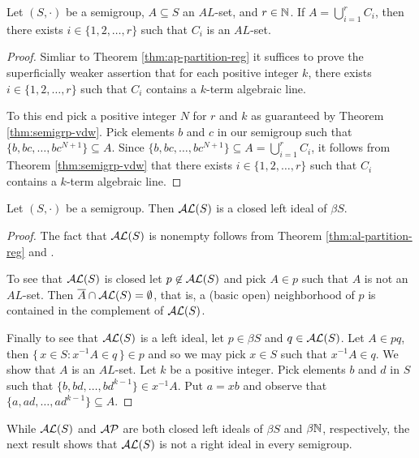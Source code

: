 \begin{thm}
  \label{thm:al-partition-reg}
  Let $(S, \cdot)$ be a semigroup, $A \subseteq S$ an $AL$-set, and $r \in \mathbb{N}$.
  If $A = \bigcup_{i=1}^r C_i$, then there exists $i \in \{1, 2, \ldots, r\}$ such that $C_i$ is an $AL$-set.
\end{thm}
\begin{proof}
  Simliar to Theorem \ref{thm:ap-partition-reg} it suffices to prove the superficially weaker assertion that for each positive integer $k$, there exists $i \in \{1, 2, \ldots, r\}$ such that $C_i$ contains a $k$-term algebraic line.
  
  To this end pick a positive integer $N$ for $r$ and $k$ as guaranteed by Theorem \ref{thm:semigrp-vdw}. 
  Pick elements $b$ and $c$ in our semigroup such that $\{b, bc, \ldots, bc^{N+1}\} \subseteq A$. 
  Since $\{b, bc, \ldots, bc^{N+1}\} \subseteq A = \bigcup_{i=1}^r C_i$, it follows from Theorem \ref{thm:semigrp-vdw} that there exists $i \in \{1, 2, \ldots, r\}$ such that $C_i$ contains a $k$-term algebraic line.
\end{proof}

\begin{thm}
  Let $(S, \cdot)$ be a semigroup.
  Then $\mathcal{AL}(S)$ is a closed left ideal of $\beta S$.
\end{thm}
\begin{proof}
  The fact that $\mathcal{AL}(S)$ is nonempty follows from Theorem \ref{thm:al-partition-reg} and \cite[Theorem 3.11]{Hindman:1998fk}. 

  To see that $\mathcal{AL}(S)$ is closed let $p \not\in \mathcal{AL}(S)$ and pick $A \in p$ such that $A$ is not an $AL$-set.
  Then $\overline{A} \cap \mathcal{AL}(S) = \emptyset$, that is, a (basic open) neighborhood of $p$ is contained in the complement of $\mathcal{AL}(S)$.

  Finally to see that $\mathcal{AL}(S)$ is a left ideal, let $p \in \beta S$ and $q \in \mathcal{AL}(S)$. 
  Let $A \in pq$, then $\{\, x \in S : x^{-1}A \in q \,\} \in p$ and so we may pick $x \in S$ such that $x^{-1}A \in q$. 
  We show that $A$ is an $AL$-set.
  Let $k$ be a positive integer.
  Pick elements $b$ and $d$ in $S$ such that $\{b, bd, \ldots, bd^{k-1}\} \in x^{-1}A$.
  Put $a = xb$ and observe that $\{a, ad, \ldots, ad^{k-1}\} \subseteq A$.
\end{proof}

While $\mathcal{AL}(S)$ and $\mathcal{AP}$ are both closed left ideals of $\beta S$ and $\beta \mathbb{N}$, respectively, the next result shows that $\mathcal{AL}(S)$ is not a right ideal in every semigroup. 

